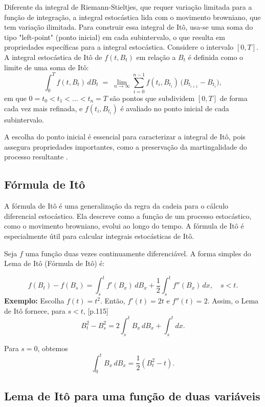 \documentclass[12pt,openright,oneside,a4paper]{abntex2}
\numberwithin{equation}{section}
\begin{document}
Diferente da integral de Riemann-Stieltjes, que requer variação limitada para a função de integração, a integral estocástica lida com o movimento browniano, que tem variação ilimitada. Para construir essa integral de Itô, usa-se uma soma do tipo "left-point" (ponto inicial) em cada subintervalo, o que resulta em propriedades específicas para a integral estocástica. Considere o intervalo $[0,T]$. A integral estocástica de Itô de $f(t, B_t)$ em relação a $B_t$ é definida como o limite de uma soma de Itô:
\begin{equation}
\int_0^T f(t, B_t) \, dB_t  
\;=\; 
\lim_{n \to \infty}  
\sum_{i=0}^{n-1}  
f(t_i, B_{t_i}) \,\bigl(B_{t_{i+1}} - B_{t_i}\bigr),
\end{equation}
em que $0 = t_0 < t_1 < \dots < t_n = T$ são pontos que subdividem $[0,T]$ de forma cada vez mais refinada, e $f(t_i, B_{t_i})$ é avaliado no ponto inicial de cada subintervalo.

\medskip

A escolha do ponto inicial é essencial para caracterizar a integral de Itô, pois assegura propriedades importantes, como a preservação da martingalidade do processo resultante \parencite [p.~103] {Mikosh}.

\subsection{Fórmula de Itô}

A fórmula de Itô é uma generalização da regra da cadeia para o cálculo diferencial estocástico. Ela descreve como a função de um processo estocástico, como o movimento browniano, evolui ao longo do tempo. A fórmula de Itô é especialmente útil para calcular integrais estocásticas de Itô.

Seja $f$ uma função duas vezes continuamente diferenciável. A forma simples do Lema de Itô (Fórmula de Itô) é:

\begin{equation}
f(B_t) - f(B_s) = \int_s^t f'(B_x) \, dB_x + \frac{1}{2} \int_s^t f''(B_x) \, dx, 
\quad s < t.
\end{equation}
\textbf{Exemplo:}  
Escolha $f(t) = t^2$. Então, $f'(t) = 2t$ e $f''(t) = 2$. Assim, o Lema de Itô fornece, para $s < t$, \textcite{Mikosh}[p.115]
$$
B_t^2 - B_s^2 = 2 \int_s^t B_x \, dB_x + \int_s^t dx.
$$

Para $s = 0$, obtemos  
$$
\int_0^t B_x \, dB_x = \frac{1}{2} (B_t^2 - t).
$$

\subsection{Lema de Itô para uma função de duas variáveis}
\end{document}
